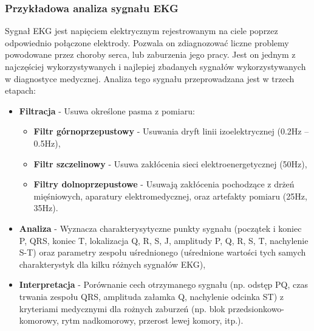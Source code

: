 \subsubsection{Przykładowa analiza sygnału EKG}

Sygnał EKG jest napięciem elektrycznym rejestrowanym na ciele poprzez odpowiednio połączone elektrody. Pozwala on zdiagnozować liczne problemy powodowane przez choroby serca, lub zaburzenia jego pracy. Jest on jednym z najczęściej wykorzystywanych i najlepiej zbadanych sygnałów wykorzystywanych w diagnostyce medycznej. Analiza tego sygnału przeprowadzana jest w trzech etapach:


\begin{itemize}
	\item \textbf{Filtracja} - Usuwa określone pasma z pomiaru:
	\begin{itemize}
		\item \textbf{Filtr górnoprzepustowy} - Usuwania dryft linii izoelektrycznej (0.2Hz – 0.5Hz),
		\item \textbf{Filtr szczelinowy} - Usuwa zakłócenia sieci elektroenergetycznej (50Hz),
		\item \textbf{Filtry dolnoprzepustowe} - Usuwają zakłócenia pochodzące z drżeń mięśniowych, aparatury elektromedycznej, oraz artefakty pomiaru (25Hz, 35Hz).
	\end{itemize}
	\item \textbf{Analiza} - Wyznacza charakterysytyczne punkty sygnału (początek i koniec P, QRS, koniec T, lokalizacja Q, R, S, J, amplitudy P, Q, R, S, T, nachylenie S-T) oraz parametry zespołu uśrednionego (uśrednione wartości tych samych charakterystyk dla kilku różnych sygnałów EKG),
	\item \textbf{Interpretacja} - Porównanie cech otrzymanego sygnału (np. odstęp PQ, czas trwania zespołu QRS, amplituda załamka Q, nachylenie odcinka ST) z kryteriami medycznymi dla rożnych zaburzeń (np. blok przedsionkowo-komorowy, rytm nadkomorowy, przerost lewej komory, itp.).
\end{itemize}